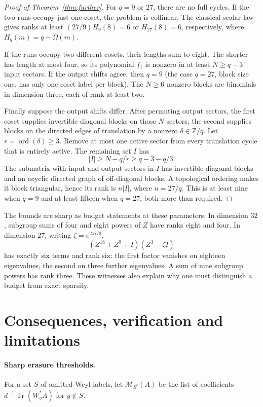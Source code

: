 \documentclass[11pt,a4paper]{article}
\theoremstyle{remark}\newtheorem{remark}[theorem]{Remark}
\DeclareMathOperator{\Tr}{Tr}
\DeclareMathOperator{\ord}{ord}
\newcommand{\Z}{\mathbb Z}
\begin{document}
\begin{proof}[Proof of Theorem~\ref{thm:further}]
For $q=9$ or $27$, there are no full cycles. If the two runs occupy just one coset, the problem is collinear. The classical scalar law \cite[Theorem 10, equation (23), in the TW470 report]{dvb} gives ranks at least $(27/9)H_9(8)=6$ or $H_{27}(8)=6$, respectively, where $H_q(m)=q-\Omega(m)$.

If the runs occupy two different cosets, their lengths sum to eight. The shorter has length at most four, so its polynomial $f_1$ is nonzero in at least $N\ge q-3$ input sectors. If the output shifts agree, then $q=9$ (the case $q=27$, block size one, has only one coset label per block). The $N\ge6$ nonzero blocks are binomials in dimension three, each of rank at least two.

Finally suppose the output shifts differ. After permuting output sectors, the first coset supplies invertible diagonal blocks on those $N$ sectors; the second supplies blocks on the directed edges of translation by a nonzero $\delta\in\Z/q$. Let $r=\ord(\delta)\ge3$. Remove at most one active sector from every translation cycle that is entirely active. The remaining set $I$ has
\[
 |I|\ge N-q/r\ge q-3-q/3.
\]
The submatrix with input and output sectors in $I$ has invertible diagonal blocks and an acyclic directed graph of off-diagonal blocks. A topological ordering makes it block triangular, hence its rank is $n|I|$, where $n=27/q$. This is at least nine when $q=9$ and at least fifteen when $q=27$, both more than required.
\end{proof}

The bounds are sharp as budget statements at these parameters. In dimension $32$, subgroup sums of four and eight powers of $Z$ have ranks eight and four. In dimension $27$, writing $\zeta=e^{2\pi i/3}$,
\[
 (Z^{18}+Z^9+I)(Z^3-\zeta I)
\]
has exactly six terms and rank six: the first factor vanishes on eighteen eigenvalues, the second on three further eigenvalues. A sum of nine subgroup powers has rank three. These witnesses also explain why one must distinguish a budget from exact sparsity.

\section{Consequences, verification and limitations}
\paragraph{Sharp erasure thresholds.}
For a set $S$ of omitted Weyl labels, let $\mathcal M_{S^c}(A)$ be the list of coefficients $d^{-1}\Tr(W_g^*A)$ for $g\notin S$.
\end{document}
